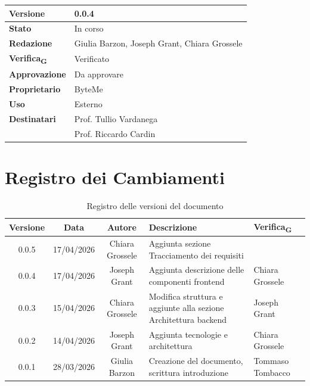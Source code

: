 \documentclass[11pt,a4paper]{article}
\newcommand{\gls}[1]{#1\textsubscript{G}}
\begin{document}
\begin{titlepage}
    \begin{table}[H]
        \centering
        \begin{tabular}{|l|p{5cm}|}
            \hline
            \textbf{Versione} & 0.0.4 \\
            \hline
            \textbf{Stato} & In corso \\
            \hline
            \textbf{Redazione} & Giulia Barzon, Joseph Grant, Chiara Grossele \\
            \hline
            \textbf{\gls{Verifica}} & Verificato \\
            \hline
            \textbf{Approvazione} & Da approvare\\
            \hline
            \textbf{Proprietario} & ByteMe \\
            \hline
            \textbf{Uso} & Esterno \\
            \hline
            \textbf{Destinatari} & Prof. Tullio Vardanega \\ & Prof. Riccardo Cardin \\
            \hline
        \end{tabular}
    \end{table}
    
    \vfill
\end{titlepage}

\thispagestyle{empty}
\section*{Registro dei Cambiamenti}

\begin{table}[H]
    \centering
    \begin{tabular}{|c|c|c|>{\raggedright\arraybackslash}p{}|p{}|}
        \hline
        \textbf{Versione} & \textbf{Data} & \textbf{Autore} & \textbf{Descrizione} & \textbf{\gls{Verifica}} \\
        \hline
        0.0.5 & 17/04/2026 & Chiara Grossele & Aggiunta sezione Tracciamento dei requisiti & \\
        \hline
        0.0.4 & 17/04/2026 & Joseph Grant & Aggiunta descrizione delle componenti frontend & Chiara Grossele\\
        \hline
        0.0.3 & 15/04/2026 & Chiara Grossele & Modifica struttura e aggiunte alla sezione Architettura backend& Joseph Grant\\
        \hline
        0.0.2 & 14/04/2026 & Joseph Grant & Aggiunta tecnologie e architettura & Chiara Grossele\\
        \hline
        0.0.1 & 28/03/2026 & Giulia Barzon & Creazione del documento, scrittura introduzione & Tommaso Tombacco \\
        \hline
    \end{tabular}
    \caption{Registro delle versioni del documento}
    \label{tab:versionamento}
\end{table}
\newpage
\end{document}
